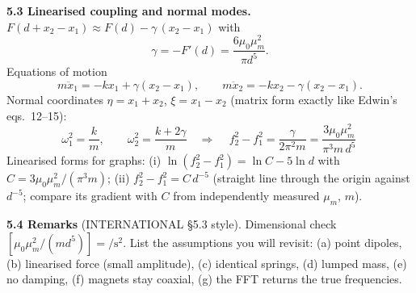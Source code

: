 \documentclass[11pt,a4paper]{article}
\newcommand{\muz}{\mu_0}
\newcommand{\mum}{\mu_m}
\begin{document}
\textbf{5.3 Linearised coupling and normal modes.}
$F(d+x_2-x_1)\approx F(d)-\gamma\,(x_2-x_1)$ with
\begin{equation}
  \gamma=-F'(d)=\frac{6\muz\mum^2}{\pi d^5}.
\end{equation}
Equations of motion
\begin{equation}
  m\ddot x_1=-kx_1+\gamma(x_2-x_1),\qquad m\ddot x_2=-kx_2-\gamma(x_2-x_1).
\end{equation}
Normal coordinates $\eta=x_1+x_2$, $\xi=x_1-x_2$ (matrix form exactly like Edwin's
eqs.~12--15):
\begin{equation}
  \omega_1^2=\frac{k}{m},\qquad \omega_2^2=\frac{k+2\gamma}{m}
  \quad\Longrightarrow\quad
  \boxed{\,f_2^2-f_1^2=\frac{\gamma}{2\pi^2 m}=\frac{3\muz\mum^2}{\pi^3 m\,d^5}\,}
  \label{eq:main}
\end{equation}
Linearised forms for graphs: (i) $\ln(f_2^2-f_1^2)=\ln C-5\ln d$ with
$C=3\muz\mum^2/(\pi^3 m)$; (ii) $f_2^2-f_1^2=C\,d^{-5}$ (straight line through the origin
against $d^{-5}$; compare its gradient with $C$ from independently measured $\mum$, $m$).

\textbf{5.4 Remarks} (INTERNATIONAL \S5.3 style). Dimensional check
$[\muz\mum^2/(m d^5)]=\si{\per\second\squared}$. List the assumptions you will revisit:
(a) point dipoles, (b) linearised force (small amplitude), (c) identical springs,
(d) lumped mass, (e) no damping, (f) magnets stay coaxial, (g) the FFT returns the true
frequencies.
\end{document}
